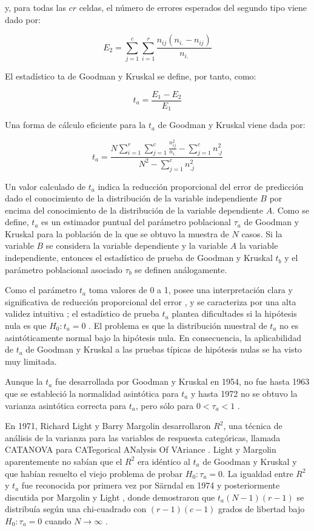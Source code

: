 \documentclass[12pt,a4paper,]{book}
\numberwithin{dummy}{section}
\theoremstyle{ocrenumbox}
\theoremstyle{blacknumex}
\theoremstyle{blacknumbox}
\theoremstyle{ocrenum}
\theoremstyle{ocrenum}
\begin{document}
y, para todas las \(cr\) celdas, el número de errores esperados del
segundo tipo viene dado por:

\[
E_2=\sum_{j=1}^c\sum_{i=1}^r\frac{n_{ij}(n_{i.}-n_{ij})}{n_{i.}}
\]

El estadístico ta de Goodman y Kruskal se define, por tanto, como:

\[
t_a=\frac{E_1-E_2}{E_1}
\]

Una forma de cálculo eficiente para la \(t_a\) de Goodman y Kruskal
viene dada por:

\[
t_a=\frac{N\displaystyle\sum_{i=1}^r\displaystyle\sum_{j=1}^c\frac{n^2_{ij}}{n_{i.}}-\displaystyle\sum_{j=1}^cn^2_{.j}}{N^2-\displaystyle\sum_{j=1}^cn^2_{.j}}
\]

Un valor calculado de \(t_a\) indica la reducción proporcional del error
de predicción dado el conocimiento de la distribución de la variable
independiente \(B\) por encima del conocimiento de la distribución de la
variable dependiente \(A\). Como se define, \(t_a\) es un estimador
puntual del parámetro poblacional \(\tau_a\) de Goodman y Kruskal para
la población de la que se obtuvo la muestra de \(N\) casos. Si la
variable \(B\) se considera la variable dependiente y la variable \(A\)
la variable independiente, entonces el estadístico de prueba de Goodman
y Kruskal \(t_b\) y el parámetro poblacional asociado \(\tau_b\) se
definen análogamente.

Como el parámetro \(t_a\) toma valores de 0 a 1, posee una
interpretación clara y significativa de reducción proporcional del error
\citep{Costner1965}, y se caracteriza por una alta validez intuitiva
\citep{Hunter1973}; el estadístico de prueba \(t_a\) plantea
dificultades si la hipótesis nula es que \(H_0: t_a = 0\)
\citep{Margolin1974}. El problema es que la distribución muestral de
\(t_a\) no es asintóticamente normal bajo la hipótesis nula. En
consecuencia, la aplicabilidad de \(t_a\) de Goodman y Kruskal a las
pruebas típicas de hipótesis nulas se ha visto muy limitada.

Aunque la \(t_a\) fue desarrollada por Goodman y Kruskal en 1954, no fue
hasta 1963 que se estableció la normalidad asintótica para \(t_a\) y
hasta 1972 no se obtuvo la varianza asintótica correcta para \(t_a\),
pero sólo para \(0 < \tau_a < 1\) \citep{Goodman1963}.

En 1971, Richard Light y Barry Margolin desarrollaron \(R^2\), una
técnica de análisis de la varianza para las variables de respuesta
categóricas, llamada CATANOVA para CATegorical ANalysis Of VAriance
\citep{Light1971.1}. Light y Margolin aparentemente no sabían que el
\(R^2\) era idéntico al \(t_a\) de Goodman y Kruskal y que habían
resuelto el viejo problema de probar \(H_0: \tau_a = 0\). La igualdad
entre \(R^2\) y \(t_a\) fue reconocida por primera vez por Särndal en
1974 \citep{Sarndal1974} y posteriormente discutida por Margolin y Light
\citep{Margolin1974}, donde demostraron que \(t_a(N-1)(r-1)\) se
distribuía según una chi-cuadrado con \((r - 1)(c - 1)\) grados de
libertad bajo \(H_0: \tau_a = 0\) cuando \(N \rightarrow \infty\)
\citep{Berry1985}.
\end{document}
